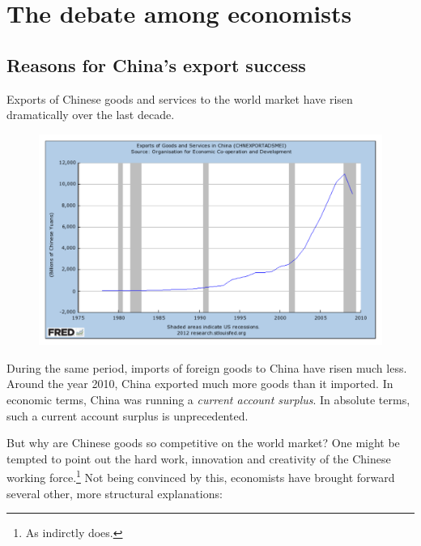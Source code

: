 \documentclass[11pt]{article}
\begin{document}
\setlength{\parindent}{0pt}

\tableofcontents
\section{The debate among economists}

\subsection{Reasons for China's export success}

Exports of Chinese goods and services to the world market have risen dramatically over the last decade. %
   
     \begin{figure}[h]
     \begin{center}
     \includegraphics[width=1\textwidth]{ExportsChinaFRED.pdf}
     \end{center}
     \end{figure}

During the same period, imports of foreign goods to China have risen much less. Around the year 2010, China exported much more goods than it imported. In economic terms, China was running a \emph{current account surplus}. In absolute terms, such a current account surplus  is unprecedented. %

But why are Chinese goods so competitive on the world market? One might be tempted to point out the hard work, innovation and creativity of the Chinese working force.\footnote{As \cite[p. 18]{Yu2010} indirctly does.} Not being convinced by this, economists have brought forward several other, more structural explanations:
\end{document}
